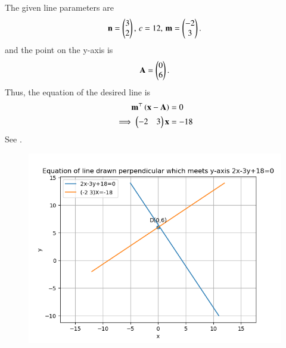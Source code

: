 		The given line
parameters are
\begin{align}
		\mathbf{n} = \begin{pmatrix}3\\2\end{pmatrix},\, c=12 ,\,
	\mathbf{m} =\begin{pmatrix}-2 \\ 3\end{pmatrix}.
\end{align}
and the point on the y-axis is
\begin{align}
	\mathbf{A} =\begin{pmatrix}0\\6\end{pmatrix}.
\end{align}
Thus, the equation of the desired line is 
\begin{align}
	\mathbf{m}^\top\left(\mathbf{x}-\mathbf{A}\right)&=0\label{eq:chapters/11/10/4/7/5}
	\\
\implies
			\begin{pmatrix}-2 & 3\end{pmatrix}\mathbf{x} &=-18
		\end{align}
		See 
  .
\begin{figure}[h]
\includegraphics[width=\columnwidth]{chapters/11/10/4/7/figs/fig.png}
\caption{}
  \label{fig:chapters/11/10/4/7/Figure}
\end{figure}
